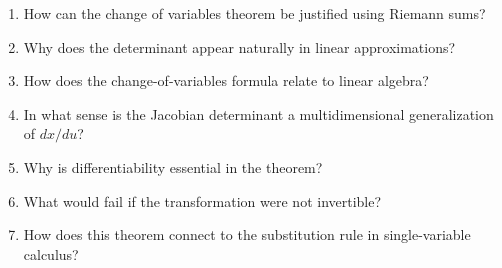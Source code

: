 \begin{enumerate}[resume]
  \item How can the change of variables theorem be justified using Riemann sums?
  \item Why does the determinant appear naturally in linear approximations?
  \item How does the change-of-variables formula relate to linear algebra?
  \item In what sense is the Jacobian determinant a multidimensional generalization of \(dx/du\)?
  \item Why is differentiability essential in the theorem?
  \item What would fail if the transformation were not invertible?
  \item How does this theorem connect to the substitution rule in single-variable calculus?
\end{enumerate}
